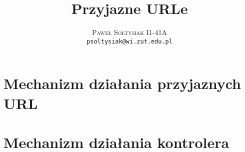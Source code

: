 \documentclass{article}
\title{Przyjazne URLe}
\author{\textsc{Paweł Sołtysiak I1-41A} \\ \texttt{psoltysiak@wi.zut.edu.pl}}
\begin{document}
\maketitle

\section{Mechanizm działania przyjaznych URL}
\section{Mechanizm działania kontrolera}
\end{document}
